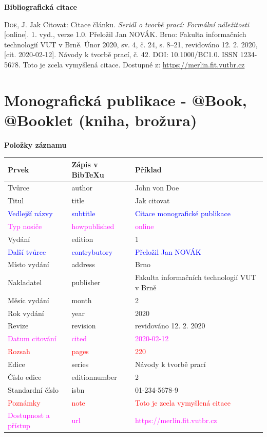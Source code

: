 \bigskip

\noindent \textbf{Bibliografická citace}

\medskip

\noindent \textsc{Doe}, J. Jak Citovat: Citace článku. \textit{Seriál o tvorbě prací: Formální náležitosti} [online]. 1. vyd., verze 1.0. Přeložil Jan NOVÁK. Brno: Fakulta informačních technologií VUT v Brně. Únor 2020, sv. 4, č. 24, s. 8–21, revidováno 12. 2. 2020, [cit. 2020-02-12]. Návody k tvorbě prací, č. 42. DOI: 10.1000/BC1.0. ISSN 1234-5678. Toto je zcela vymyšlená citace. Dostupné z: \url{https://merlin.fit.vutbr.cz}

\newpage
\section*{Monografická publikace - @Book, @Booklet (kniha, brožura)}
\label{pr-monografie}
\noindent \textbf{Položky záznamu}

\medskip

\begin{tabularx}{\linewidth}{X X X}
    Prvek & Zápis v BibTeXu & Příklad\\\hline
    Tvůrce & author & John von Doe\\
    Titul & title & Jak citovat\\
    \textcolor{blue}{Vedlejší názvy} & \textcolor{blue}{subtitle} & \textcolor{blue}{Citace monografické publikace}\\
    \textcolor{magenta}{Typ nosiče} & \textcolor{magenta}{howpublished} & \textcolor{magenta}{online}\\
    Vydání & edition & 1\\
    \textcolor{blue}{Další tvůrce} & \textcolor{blue}{contrybutory} & \textcolor{blue}{Přeložil Jan NOVÁK}\\
    Místo vydání & address & Brno\\
    Nakladatel & publisher & Fakulta informačních technologií VUT v Brně\\
    Měsíc vydání & month & 2\\
    Rok vydání & year & 2020\\
    Revize & revision & revidováno 12. 2. 2020\\
    \textcolor{magenta}{Datum citování} & \textcolor{magenta}{cited} & \textcolor{magenta}{2020-02-12}\\
    \textcolor{red}{Rozsah} & \textcolor{red}{pages} & \textcolor{red}{220}\\
    Edice & series & Návody k tvorbě prací\\
    Číslo edice & editionnumber & 2\\
    Standardní číslo & isbn & 01-234-5678-9\\
    \textcolor{red}{Poznámky} & \textcolor{red}{note} & \textcolor{red}{Toto je zcela vymyšlená citace}\\
    \textcolor{magenta}{Dostupnost a přístup} & \textcolor{magenta}{url} & \textcolor{magenta}{https://merlin.fit.vutbr.cz}\\
\end{tabularx}

